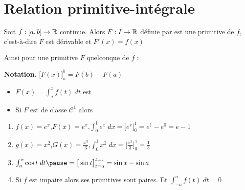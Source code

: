 \section*{Relation primitive-intégrale}


\begin{frame}
\begin{theoreme}
Soit $f : [a,b] \to \mathbb{R}$ continue. Alors $F:I \to \mathbb{R}$ définie par
\vspace*{-0.7ex}
\vspace*{-0.7ex}
est une primitive de $f$, c'est-à-dire $F$ est dérivable et $F'(x)=f(x)$

\pause

Ainsi pour une primitive $F$ quelconque de $f$ :
\vspace*{-0.7ex}
\end{theoreme}

\pause

\textbf{Notation.}  $\big[F(x)\big]_a^b=F(b)-F(a)$

\pause

\begin{itemize}
  \item $F(x)=\int_a^x f(t) \; dt$ est 

\pause

  \item Si $F$ est de classe $\mathcal{C}^1$ alors 
\end{itemize}  
\end{frame}



\begin{frame}
\begin{exemple}

\begin{enumerate}
  \item $f(x)=e^x$,\quad \pause $F(x)=e^x$,\quad \pause $\int_0^1 e^x \; dx =  \big[e^x\big]_0^1=e^1-e^0=e-1$
\pause
\medskip

  \item $g(x)=x^2$,\quad \pause $G(x)=\frac{x^3}{3}$,\quad \pause $\int_0^1 x^2 \; dx =  \big[\tfrac{x^3}{3}\big]_0^1=\tfrac{1}{3}$
\pause
\medskip

  \item $\int_a^x \cos t \; dt \pause= \big[ \sin t\big]_{t=a}^{t=x} = \sin x - \sin a$
\pause
\medskip

  \item Si $f$ est impaire alors ses primitives sont paires. \pause Et $\int_{-a}^a f(t)  \; dt = 0$
\end{enumerate}
\end{exemple}

\end{frame}



